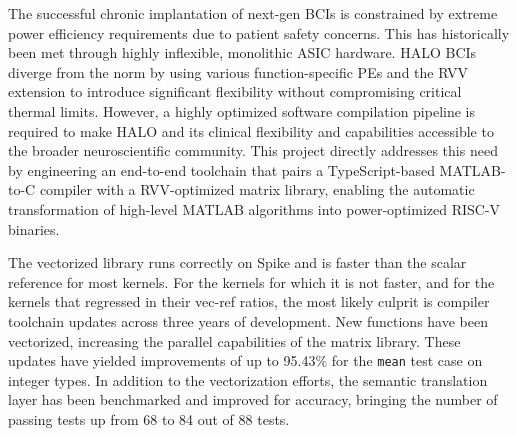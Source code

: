 

The successful chronic implantation of next-gen BCIs is constrained by extreme power efficiency requirements due to patient safety concerns. This has historically been met through highly inflexible, monolithic ASIC hardware. HALO BCIs diverge from the norm by using various function-specific PEs and the RVV extension to introduce significant flexibility without compromising critical thermal limits. However, a highly optimized software compilation pipeline is required to make HALO and its clinical flexibility and capabilities accessible to the broader neuroscientific community. This project directly addresses this need by engineering an end-to-end toolchain that pairs a TypeScript-based MATLAB-to-C compiler with a RVV-optimized matrix library, enabling the automatic transformation of high-level MATLAB algorithms into power-optimized RISC-V binaries.


The vectorized library runs correctly on Spike and is faster than the scalar reference for most kernels. For the kernels for which it is not faster, and for the kernels that regressed in their vec-ref ratios, the most likely culprit is compiler toolchain updates across three years of development. New functions have been vectorized, increasing the parallel capabilities of the matrix library. These updates have yielded improvements of up to 95.43\% for the \texttt{mean} test case on integer types. In addition to the vectorization efforts, the semantic translation layer has been benchmarked and improved for accuracy, bringing the number of passing tests up from 68 to 84 out of 88 tests.


